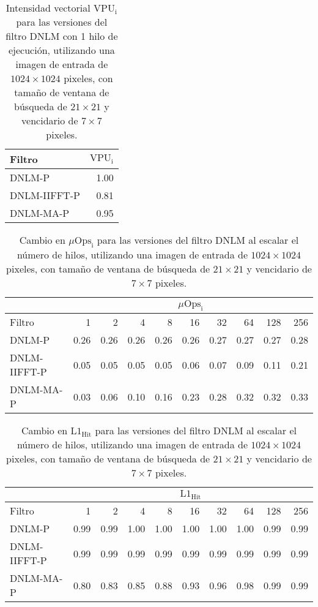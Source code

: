 \begin{table}
\centering
\caption[Intensidad vectorial de los filtros con un hilo de ejecución]{Intensidad vectorial  $\text{VPU}_{\text{i}}$ para las versiones del filtro DNLM con 1 hilo de ejecución, utilizando una imagen de entrada de $1024 \times 1024$ pixeles, con tama\~no de ventana de búsqueda de $21 \times 21$ y vencidario de $7 \times 7$ pixeles. \label{tabla:vpui}}
\begin{tabular}{lr}
 Filtro & $\text{VPU}_{\text{i}}$ \tabularnewline
\hline
DNLM-P & 1.00 \tabularnewline
DNLM-IIFFT-P & 0.81 \tabularnewline
DNLM-MA-P & 0.95 \tabularnewline
\end{tabular}
\end{table}
  
  
  
\begin{table}
\centering
\caption[Cambio en intensidad de  micro-operaciones en los filtros al escalar el n\'umero de hilos]{Cambio en  $\mu\text{Ops}_{\text{i}}$ para las versiones del filtro DNLM al escalar el n\'umero de hilos, utilizando una imagen de entrada de $1024 \times 1024$ pixeles, con tama\~no de ventana de búsqueda de $21 \times 21$ y vencidario de $7 \times 7$ pixeles. \label{tabla:ucode}}
\begin{tabular}{lrrrrrrrrr}
& \multicolumn{9}{c}{$\mu\text{Ops}_{\text{i}}$} \tabularnewline
\hline
 Filtro & 1 & 2 & 4 & 8 & 16 & 32 & 64 & 128 & 256 \tabularnewline
\hline
DNLM-P & 0.26 & 0.26 & 0.26 & 0.26 & 0.26 & 0.27 & 0.27 & 0.27 & 0.28 \tabularnewline
DNLM-IIFFT-P & 0.05 & 0.05 & 0.05 & 0.05 & 0.06 & 0.07 & 0.09 & 0.11 & 0.21 \tabularnewline
DNLM-MA-P & 0.03 & 0.06 & 0.10 & 0.16 & 0.23 & 0.28 & 0.32 & 0.32 & 0.33 \tabularnewline
\end{tabular}
\end{table}


\begin{table}
\centering
\caption[Cambio en la raz\'on de aciertos de lectura en cach\'e L1 para los filtros al escalar el n\'umero de hilos]{Cambio en  $\text{L1}_{\text{Hit}}$ para las versiones del filtro DNLM al escalar el n\'umero de hilos, utilizando una imagen de entrada de $1024 \times 1024$ pixeles, con tama\~no de ventana de búsqueda de $21 \times 21$ y vencidario de $7 \times 7$ pixeles. \label{tabla:l1_hit}}
\begin{tabular}{lrrrrrrrrr}
& \multicolumn{9}{c}{$\text{L1}_{\text{Hit}}$} \tabularnewline
\hline
 Filtro & 1 & 2 & 4 & 8 & 16 & 32 & 64 & 128 & 256 \tabularnewline
\hline
DNLM-P & 0.99 & 0.99 & 1.00 & 1.00 & 1.00 & 1.00 & 1.00 & 0.99 & 0.99 \tabularnewline
DNLM-IIFFT-P & 0.99 & 0.99 & 0.99 & 0.99 & 0.99 & 0.99 & 0.99 & 0.99 & 0.99 \tabularnewline
DNLM-MA-P & 0.80 & 0.83 & 0.85 & 0.88 & 0.93 & 0.96 & 0.98 & 0.99 & 0.99 \tabularnewline
\end{tabular}
\end{table}


